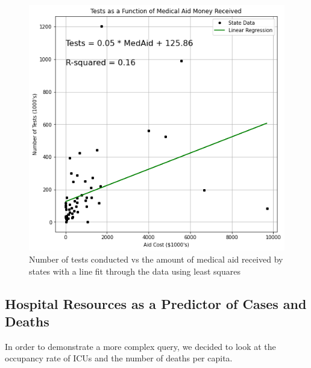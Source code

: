 \documentclass[11pt]{article}
\begin{document}
\FloatBarrier
\begin{figure}[h]
    \centering
    \includegraphics[scale=0.5]{diagrams/analysis/medaid_corr_outliers.png}
    \caption{Number of tests conducted vs the amount of medical aid received by states with a line fit through the data using least squares}
    \label{fig:test_cost_fit}
\end{figure}
\FloatBarrier

\subsection{Hospital Resources as a Predictor of Cases and Deaths}

\noindent
In order to demonstrate a more complex query, we decided to look at the occupancy rate of ICUs and the number of deaths per capita. 
\end{document}
